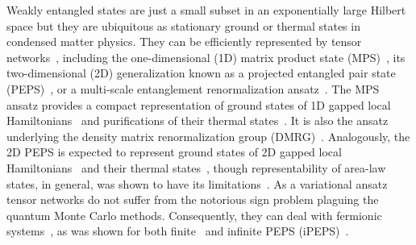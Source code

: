 \documentclass[prb,twocolumn,showkeys,showpacs,amsmath,amsfonts,floatfix,superscriptaddress,nofootinbib]{revtex4-1}
\begin{document}
Weakly entangled states are just a small subset in an exponentially large Hilbert space but they are ubiquitous as stationary ground or thermal states in condensed matter physics. They can be efficiently represented by tensor networks~\cite{Verstraete_review_08,Orus_review_14}, including the one-dimensional (1D) matrix product state (MPS)~\cite{fannes1992}, its two-dimensional (2D) generalization known as a projected entangled pair state (PEPS)~\cite{Nishino_2DvarTN_04,verstraete2004}, or a multi-scale entanglement renormalization ansatz~\cite{Vidal_MERA_07,Vidal_MERA_08,Evenbly_branchMERA_14,Evenbly_branchMERAarea_14}. The MPS ansatz provides a compact representation of ground states of 1D gapped local Hamiltonians~\cite{Verstraete_review_08,Hastings_GSarealaw_07,Schuch_MPSapprox_08} and purifications of their thermal states~\cite{Barthel_1DTMPSapprox_17}. It is also the ansatz underlying the density matrix renormalization group (DMRG)~\cite{White_DMRG_92, White_DMRG_93,Schollwock_review_05,Schollwock_review_11}. Analogously, the 2D PEPS is expected to represent ground states of 2D gapped local Hamiltonians~\cite{Verstraete_review_08,Orus_review_14} and their thermal states~\cite{Wolf_Tarealaw_08,Molnar_TPEPSapprox_15}, though representability of area-law states, in general, was shown to have its limitations~\cite{Eisert_TNapprox_16}. As a variational ansatz tensor networks do not suffer from the notorious sign problem plaguing the quantum Monte Carlo methods. Consequently, they can deal with fermionic systems~\cite{Corboz_fMERA_10,Eisert_fMERA_09,Corboz_fMERA_09,Barthel_fTN_09,Gu_fTN_10}, as was shown for both finite~\cite{Cirac_fPEPS_10} and infinite PEPS (iPEPS)~\cite{Corboz_fiPEPS_10,Corboz_stripes_11}.
\end{document}
